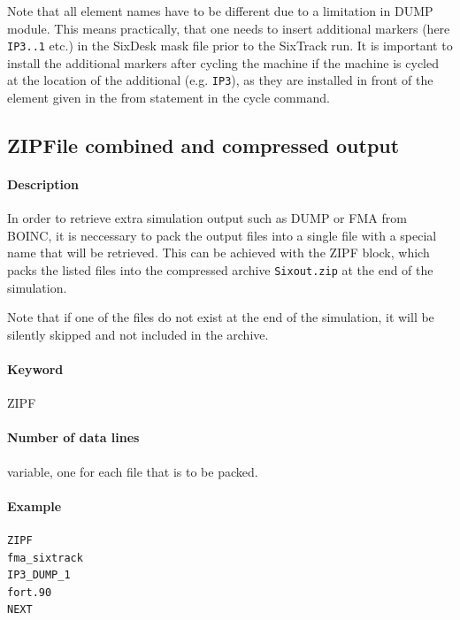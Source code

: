 Note that all element names have to be different due to a limitation in DUMP module. This means practically, that one needs to insert additional markers (here \verb|IP3..1| etc.) in the SixDesk \cite{sixdesk1,sixdesk2} mask file prior to the SixTrack run. It is important to install the additional markers after cycling the machine if the machine is cycled at the location of the additional (e.g. \verb|IP3|), as they are installed in front of the element given in the from statement in the cycle command.

\subsection{ZIPFile combined and compressed output}
\label{sec:ZIPF}

\paragraph{Description}
In order to retrieve extra simulation output such as DUMP or FMA from BOINC, it is neccessary to pack the output files into a single file with a special name that will be retrieved.
This can be achieved with the ZIPF block, which packs the listed files into the compressed archive \texttt{Sixout.zip} at the end of the simulation.

Note that if one of the files do not exist at the end of the simulation, it will be silently skipped and not included in the archive.

\paragraph{Keyword}
ZIPF

\paragraph{Number of data lines}
variable, one for each file that is to be packed.

\paragraph{Example}
\begin{verbatim}
ZIPF
fma_sixtrack
IP3_DUMP_1
fort.90
NEXT
\end{verbatim}
